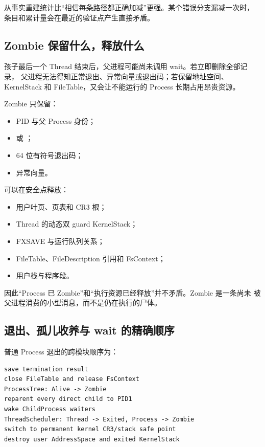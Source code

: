 从事实重建统计比“相信每条路径都正确加减”更强。某个错误分支漏减一次时，
条目和累计量会在最近的验证点产生直接矛盾。

\subsection{Zombie 保留什么，释放什么}

孩子最后一个 Thread 结束后，父进程可能尚未调用 wait。若立即删除全部记录，
父进程无法得知正常退出、异常向量或退出码；若保留地址空间、KernelStack 和
FileTable，又会让不能运行的 Process 长期占用昂贵资源。

Zombie 只保留：

\begin{itemize}
  \item PID 与父 Process 身份；
  \item {} 或 ；
  \item 64 位有符号退出码；
  \item 异常向量。
\end{itemize}

可以在安全点释放：

\begin{itemize}
  \item 用户叶页、页表和 CR3 根；
  \item Thread 的动态双 guard KernelStack；
  \item FXSAVE 与运行队列关系；
  \item FileTable、FileDescription 引用和 FsContext；
  \item 用户栈与程序段。
\end{itemize}

因此“Process 已 Zombie”和“执行资源已经释放”并不矛盾。Zombie 是一条尚未
被父进程消费的小型消息，而不是仍在执行的尸体。

\subsection{退出、孤儿收养与 wait 的精确顺序}

普通 Process 退出的跨模块顺序为：

\begin{lstlisting}[caption={退出路径的所有权顺序}]
save termination result
close FileTable and release FsContext
ProcessTree: Alive -> Zombie
reparent every direct child to PID1
wake ChildProcess waiters
ThreadScheduler: Thread -> Exited, Process -> Zombie
switch to permanent kernel CR3/stack safe point
destroy user AddressSpace and exited KernelStack
\end{lstlisting}

